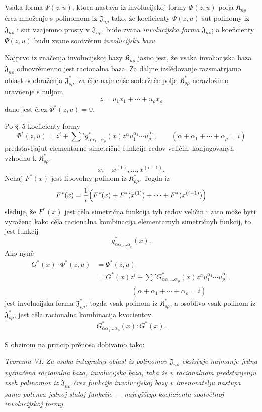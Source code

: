 \documentclass[11pt]{article}
\providecommand{\Kfield}{\mathfrak{K}}
\providecommand{\Jdom}{\mathfrak{J}}
\begin{document}
Vsaka forma $\Psi(z,u)$, ktora nastava iz involucijskoj formy $\Phi(z,u)$ polja $\Kfield_{n\rho}$ črez množenje s polinomom iz $\Jdom_{n\rho}$ tako, že koeficienty $\Psi(z,u)$ sut polinomy iz $\Jdom_{n\rho}$ i sut vzajemno prosty v $\Jdom_{n\rho}$, bude zvana {\itshape involucijska forma} $\Jdom_{n\rho}$; a koeficienty $\Psi(z,u)$ budu zvane sootvětnu {\itshape involucijsku bazu}.

Najprvo iz značenja involucijskoj bazy $\Kfield_{n\rho}$ jasno jest, že vsaka involucijska baza $\Jdom_{n\rho}$ odnovrěmenno jest racionalna baza. Za daljne izslědovanje razsmatrjamo oblast odobraženja $\Jdom^*_{\rho\rho}$, za čije najmenše soderžeče polje $\Kfield^*_{\rho\rho}$ nerazložimo uravnenje s nuljom
\[
  z=u_1x_1+\cdots+u_\rho x_\rho
\]
dano jest črez $\Phi^*(z,u)=0$.

Po \S\ 5 koeficienty formy
\[
  \Phi^*(z,u)=z^i+\sum{}' g^*_{\alpha\alpha_1\ldots\alpha_\rho}(x)
  z^\alpha u_1^{\alpha_1}\cdots u_\rho^{\alpha_\rho},
  \qquad
  (\alpha+\alpha_1+\cdots+\alpha_\rho=i)
\]
predstavljajut elementarne simetrične funkcije redov veličin, konjugovanyh vzhodno k $\Kfield^*_{\rho\rho}$:
\[
  x,\quad x^{(1)},\ldots,x^{(i-1)}.
\]
Nehaj $F^*(x)$ jest libovolny polinom iz $\Kfield^*_{\rho\rho}$. Togda iz
\[
  F^*(x)=\frac1i\Bigl(F^*(x)+F^*(x^{(1)})+
  \cdots+F^*(x^{(i-1)})\Bigr)
\]
slěduje, že $F^*(x)$ jest cěla simetrična funkcija tyh redov veličin i zato može byti vyražena kako cěla racionalna kombinacija elementarnyh simetričnyh funkcij, to jest funkcij
\[
  g^*_{\alpha\alpha_1\ldots\alpha_\rho}(x).
\]
Ako nyně
\[
\begin{aligned}
  G^*(x)\cdot\Phi^*(z,u)
  &=\Psi^*(z,u)\\
  &=G^*(x)z^i+
    \sum{}'G^*_{\alpha\alpha_1\ldots\alpha_\rho}(x)
    z^\alpha u_1^{\alpha_1}\cdots u_\rho^{\alpha_\rho},\\
  &\hspace{5em}(\alpha+\alpha_1+\cdots+\alpha_\rho=i)
\end{aligned}
\]
jest involucijska forma $\Jdom^*_{\rho\rho}$, togda vsak polinom iz $\Kfield^*_{\rho\rho}$, a osoblivo vsak polinom iz $\Jdom^*_{\rho\rho}$, jest cěla racionalna kombinacija kvocientov
\[
  G^*_{\alpha\alpha_1\ldots\alpha_\rho}(x):G^*(x).
\]

S obzirom na princip prěnosa dobivamo tako:

{\itshape Teoremu VI: Za vsaku integralnu oblast iz polinomov $\Jdom_{n\rho}$ eksistuje najmanje jedna vyznačena racionalna baza, involucijska baza, taka že v racionalnom predstavjenju vseh polinomov iz $\Jdom_{n\rho}$ črez funkcije involucijskoj bazy v imenovatelju nastupa samo potenca jednoj staloj funkcije --- najvyššego koeficienta sootvětnoj involucijskoj formy.}
\end{document}
